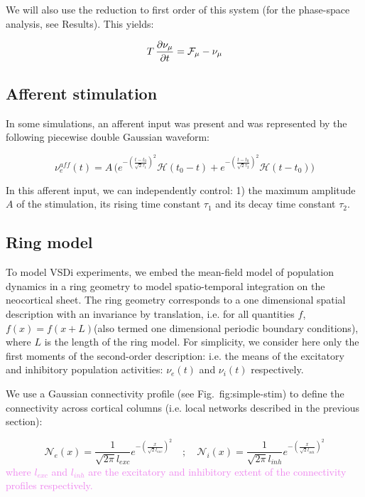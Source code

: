 \documentclass[8pt, colorlinks, a4paper]{article}
\renewcommand\ref{}
\newcommand{\corr}[1]{{\textcolor{violet}{#1}}}
\begin{document}
We will also use the reduction to first order of this system (for the
phase-space analysis, see Results). This yields:

\begin{equation}
\label{eq:master-eq-1st-order}
T \, \frac{\partial \nu_\mu}{\partial t} = \mathcal{F}_\mu - \nu_\mu \\
\end{equation}

\subsection{Afferent stimulation}
\label{sec-3-8}

In some simulations, an afferent input was present and was represented
by the following piecewise double Gaussian waveform:

\begin{equation}
\label{eq:input}
\nu_e^{aff}(t) = A \, \Big(
e^{-(\frac{t-t_0}{\sqrt{2} \tau_1})^2} \mathcal{H}(t_0-t)+
e^{-(\frac{t-t_0}{\sqrt{2} \tau_2})^2} \mathcal{H}(t-t_0)
\Big)
\end{equation}

In this afferent input, we can independently control: 1) the maximum
amplitude \(A\) of the stimulation, its rising time constant
\(\tau_1\) and its decay time constant \(\tau_2\).

\subsection{Ring model}
\label{sec-3-7}

To model VSDi experiments, we embed the mean-field model of population
dynamics in a ring geometry to model spatio-temporal integration on
the neocortical sheet. The ring geometry corresponds to a one
dimensional spatial description with an invariance by translation,
i.e. for all quantities \(f\), \(f(x)=f(x+L)\)(also termed one
dimensional periodic boundary conditions), where \(L\) is the length
of the ring model. For simplicity, we consider here only the first
moments of the second-order description: i.e. the means of the
excitatory and inhibitory population activities: \(\nu_e(t)\) and
\(\nu_i(t)\) respectively.

We use a Gaussian connectivity profile (see
Fig.~\ref{fig:simple-stim}) to define the connectivity across cortical
columns (i.e. local networks described in the previous section):

\begin{equation}
\mathcal{N}_e(x) = \frac{1}{\sqrt{2 \pi} l_{exc}} e^{-(\frac{x}{\sqrt{2} l_{exc}})^2} \quad ; \quad 
\mathcal{N}_i(x) = \frac{1}{\sqrt{2 \pi} l_{inh}} e^{-(\frac{x}{\sqrt{2} l_{inh}})^2}
\end{equation}
\corr{where \(l_{exc}\) and \(l_{inh}\) are the excitatory and inhibitory
extent of the connectivity profiles respectively.}
\end{document}

